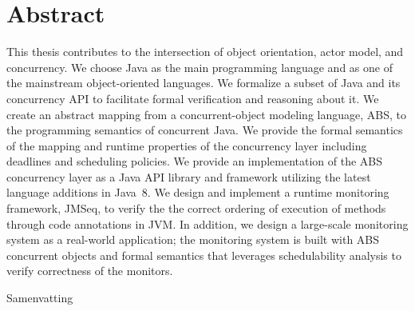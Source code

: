 %
\chapter*{Abstract}
\label{sec:abstract}
\vspace*{-10mm}

This thesis contributes to the intersection of object orientation, actor model, and concurrency.
We choose Java as the main programming language and as one of the mainstream 
object-oriented languages. 
We formalize a subset of Java and its concurrency API to 
facilitate formal verification and reasoning about it.
We create an abstract mapping from a concurrent-object modeling language, 
ABS, to the programming semantics of concurrent Java. 
We provide the formal semantics of the mapping and runtime properties of 
the concurrency layer including deadlines and scheduling policies.
We provide an implementation of the ABS concurrency layer as a Java API library 
and framework utilizing the latest language additions 
in Java~8.
We design and implement a runtime monitoring framework, JMSeq, to verify the
the correct ordering of execution of methods through code annotations in JVM. 
In addition, we design a large-scale monitoring system as a real-world 
application; the monitoring system is built with ABS concurrent objects 
and formal semantics that leverages schedulability 
analysis to verify correctness of the monitors.

\vspace*{20mm}

{Samenvatting}\label{sec:abstract-diff} \\

